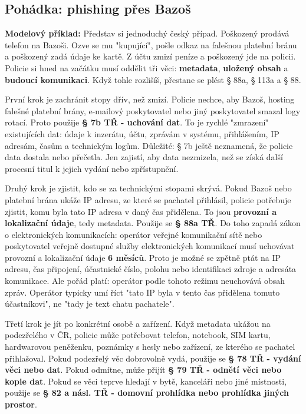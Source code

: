 \documentclass[11pt,a4paper]{article}
\newcommand{\modelovy}[1]{\begin{tcolorbox}[breakable,enhanced,colback=green!7,colframe=green!30!black,boxrule=0pt,arc=1mm,left=5pt,right=5pt,top=5pt,bottom=5pt,before skip=6pt,after skip=6pt]\textbf{Modelový příklad:} #1\end{tcolorbox}}
\begin{document}
\subsection*{Pohádka: phishing přes Bazoš}
\modelovy{Představ si jednoduchý český případ. Poškozený prodává telefon na Bazoši. Ozve se mu "kupující", pošle odkaz na falešnou platební bránu a poškozený zadá údaje ke kartě. Z účtu zmizí peníze a poškozený jde na policii. Policie si hned na začátku musí oddělit tři věci: \textbf{metadata}, \textbf{uložený obsah} a \textbf{budoucí komunikaci}. Když tohle rozlišíš, přestane se plést § 88a, § 113a a § 88.

První krok je zachránit stopy dřív, než zmizí. Policie nechce, aby Bazoš, hosting falešné platební brány, e-mailový poskytovatel nebo jiný poskytovatel smazal logy rotací. Proto použije \textbf{§ 7b TŘ - uchování dat}. To je rychlé "zmrazení" existujících dat: údaje k inzerátu, účtu, zprávám v systému, přihlášením, IP adresám, časům a technickým logům. Důležité: § 7b ještě neznamená, že policie data dostala nebo přečetla. Jen zajistí, aby data nezmizela, než se získá další procesní titul k jejich vydání nebo zpřístupnění.

Druhý krok je zjistit, kdo se za technickými stopami skrývá. Pokud Bazoš nebo platební brána ukáže IP adresu, ze které se pachatel přihlásil, policie potřebuje zjistit, komu byla tato IP adresa v daný čas přidělena. To jsou \textbf{provozní a lokalizační údaje}, tedy metadata. Použije se \textbf{§ 88a TŘ}. Do toho zapadá zákon o elektronických komunikacích: operátor veřejné komunikační sítě nebo poskytovatel veřejně dostupné služby elektronických komunikací musí uchovávat provozní a lokalizační údaje \textbf{6 měsíců}. Proto je možné se zpětně ptát na IP adresu, čas připojení, účastnické číslo, polohu nebo identifikaci zdroje a adresáta komunikace. Ale pořád platí: operátor podle tohoto režimu neuchovává obsah zpráv. Operátor typicky umí říct "tato IP byla v tento čas přidělena tomuto účastníkovi", ne "tady je text chatu pachatele".

Třetí krok je jít po konkrétní osobě a zařízení. Když metadata ukážou na podezřelého v ČR, policie může potřebovat telefon, notebook, SIM kartu, hardwarovou peněženku, poznámky s hesly nebo zařízení, ze kterého se pachatel přihlašoval. Pokud podezřelý věc dobrovolně vydá, použije se \textbf{§ 78 TŘ - vydání věci nebo dat}. Pokud odmítne, může přijít \textbf{§ 79 TŘ - odnětí věci nebo kopie dat}. Pokud se věci teprve hledají v bytě, kanceláři nebo jiné místnosti, použije se \textbf{§ 82 a násl. TŘ - domovní prohlídka nebo prohlídka jiných prostor}.

}
\end{document}
